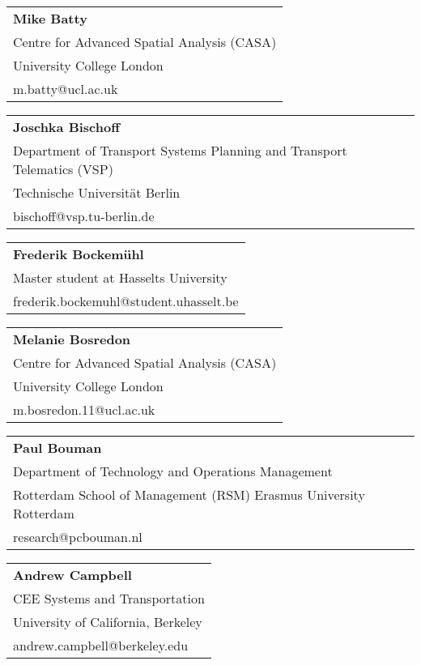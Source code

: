 \begin{tabular}[width=0.48\textwidth]{@{}l}
\textbf{Mike Batty} \\
Centre for Advanced Spatial Analysis (CASA) \\
University College London \\
m.batty@ucl.ac.uk \\
\end{tabular}

\begin{tabular}[width=0.48\textwidth]{@{}l}
\textbf{Joschka Bischoff} \\
Department of Transport Systems Planning and Transport Telematics (VSP) \\
Technische Universität Berlin \\
bischoff@vsp.tu-berlin.de \\
\end{tabular}

\begin{tabular}[width=0.48\textwidth]{@{}l}
\textbf{Frederik Bockemühl} \\
Master student at Hasselts University \\
frederik.bockemuhl@student.uhasselt.be \\
\end{tabular}

\begin{tabular}[width=0.48\textwidth]{@{}l}
\textbf{Melanie Bosredon} \\
Centre for Advanced Spatial Analysis (CASA) \\
University College London \\
m.bosredon.11@ucl.ac.uk \\
\end{tabular}

\begin{tabular}[width=0.48\textwidth]{@{}l}
\textbf{Paul Bouman} \\
Department of Technology and Operations Management \\
Rotterdam School of Management (RSM) Erasmus University Rotterdam \\
research@pcbouman.nl \\
\end{tabular}

\begin{tabular}[width=0.48\textwidth]{@{}l}
\textbf{Andrew Campbell} \\
CEE Systems and Transportation \\
University of California, Berkeley \\
andrew.campbell@berkeley.edu \\
\end{tabular}

